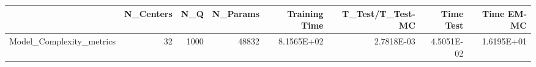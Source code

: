 \begin{tabular}{lrrrrrrr}
\toprule
{} &  N\_Centers &   N\_Q &  N\_Params &  Training Time &  T\_Test/T\_Test-MC &  Time Test &  Time EM-MC \\
\midrule
Model\_Complexity\_metrics &         32 &  1000 &     48832 &     8.1565E+02 &        2.7818E-03 & 4.5051E-02 &  1.6195E+01 \\
\bottomrule
\end{tabular}
